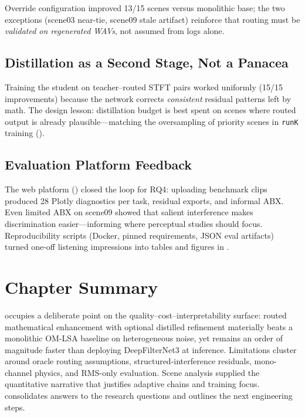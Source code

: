Override configuration improved 13/15 scenes versus monolithic base; the two exceptions (scene03 near-tie, scene09 stale artifact) reinforce that routing must be \emph{validated on regenerated WAVs}, not assumed from logs alone.

\subsection{Distillation as a Second Stage, Not a Panacea}

Training the student on teacher--routed STFT pairs worked uniformly (15/15 improvements) because the network corrects \emph{consistent} residual patterns left by math. The design lesson: distillation budget is best spent on scenes where routed output is already plausible---matching the oversampling of priority scenes in \texttt{runK} training ().

\subsection{Evaluation Platform Feedback}

The web platform () closed the loop for RQ4: uploading benchmark clips produced 28 Plotly diagnostics per task, residual exports, and informal ABX. Even limited ABX on scene09 showed that salient interference makes discrimination easier---informing where perceptual studies should focus. Reproducibility scripts (Docker, pinned requirements, JSON eval artifacts) turned one-off listening impressions into tables and figures in .

\section{Chapter Summary}
\label{sec:discussion_summary}

\projectshort{} occupies a deliberate point on the quality--cost--interpretability surface: routed mathematical enhancement with optional distilled refinement materially beats a monolithic OM-LSA baseline on heterogeneous noise, yet remains an order of magnitude faster than deploying DeepFilterNet3 at inference. Limitations cluster around oracle routing assumptions, structured-interference residuals, mono-channel physics, and RMS-only evaluation. Scene analysis supplied the quantitative narrative that justifies adaptive chains and training focus.  consolidates answers to the research questions and outlines the next engineering steps.
